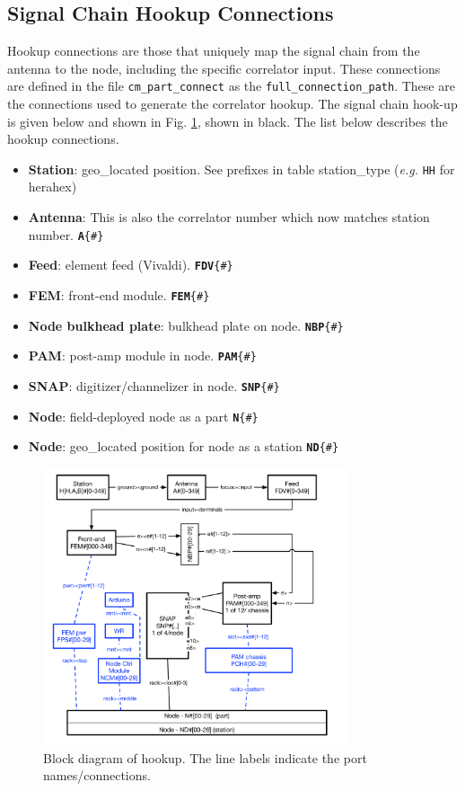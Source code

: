 \documentclass{article}
\begin{document}
\subsection{Signal Chain Hookup Connections}
Hookup connections are those that uniquely map the signal chain from the antenna to the node, including the specific correlator input.  These connections are defined in the file {\tt cm\_part\_connect} as the {\tt full\_connection\_path}.  These are the connections used to generate the correlator hookup.
The signal chain hook-up is given below and shown in Fig. \ref{fig:hookup}, shown in black.  The list below describes the hookup connections.
\begin{itemize}\setlength\itemsep{-.3em}
	\item {\bf Station}: geo\_located position.  See prefixes in table station\_type ({\em e.g.} {\tt HH} for herahex)
	\item {\bf Antenna}:  This is also the correlator number which now matches station number.  {\tt{\bf A}\{\#\}}
	\item {\bf Feed}:  element feed (Vivaldi).  {\tt {\bf FDV}\{\#\}}
	\item {\bf FEM}:  front-end module. {\tt {\bf FEM}\{\#\}}
	\item {\bf Node bulkhead plate}:  bulkhead plate on node.  {\tt {\bf NBP}\{\#\}}
	\item {\bf PAM}:  post-amp module in node. {\tt {\bf PAM}\{\#\}}
	\item {\bf SNAP}:  digitizer/channelizer in node. {\tt {\bf SNP}\{\#\}}
	\item {\bf Node}: field-deployed node as a part {\tt {\bf N}\{\#\}}
	\item {\bf Node}:  geo\_located position for node as a station {\tt {\bf ND}\{\#\}}
\end{itemize}

\begin{figure}[H]
\includegraphics[width=0.8\textwidth]{hookup.pdf}
\centering
\caption{Block diagram of hookup.  The line labels indicate the port names/connections.}
\label{fig:hookup}
\end{figure}
\end{document}
